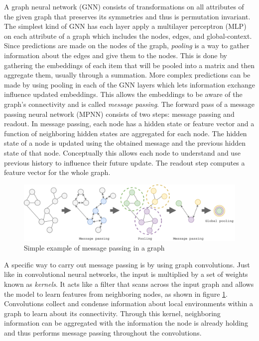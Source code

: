 \documentclass[12pt]{scrartcl}
\begin{document}
A graph neural network (GNN) consists of transformations on all attributes of the given graph 
that preserves its symmetries and thus is permutation invariant. The simplest kind of GNN has 
each layer apply a multilayer perceptron (MLP) on each attribute of a graph which includes the
nodes, edges, and global-context. Since predictions are made on the nodes of the graph, \emph{pooling} 
is a way to gather information about the edges and give them to the nodes. This is done by 
gathering the embeddings of each item that will be pooled into a matrix and then aggregate them, 
usually through a summation. More complex predictions can be made by using pooling 
in each of the GNN layers which lets information exchange influence updated embeddings. This 
allows the embeddings to be aware of the graph's connectivity and is called \emph{message passing}. 
The forward pass of a message passing neural network (MPNN) consists of two steps: message passing 
and readout. In message passing, each node has a hidden state or feature vector and a function of 
neighboring hidden states are aggregated for each node. The hidden state of a node is updated using 
the obtained message and the previous hidden state of that node. Conceptually this allows each node 
to understand and use previous history to influence their future update. The readout step computes 
a feature vector for the whole graph.

\begin{figure}
  \centering
  \includegraphics[scale=.75]{mpnn.png}
  
  \caption{Simple example of message passing in a graph}\label{fig:mpnn}
\end{figure}

A specific way to carry out message passing is by using graph convolutions. Just like in convolutional 
neural networks, the input is multiplied by a set of weights known as \emph{kernels}. It acts like a 
filter that scans across the input graph and allows the model to learn features from neighboring nodes, as shown in figure \ref{fig:mpnn}.
Convolutions collect and condense information about local environments within a graph to learn about 
its connectivity. Through this kernel, neighboring information can be aggregated with the information 
the node is already holding and thus performs message passing throughout the convolutions.
\end{document}
